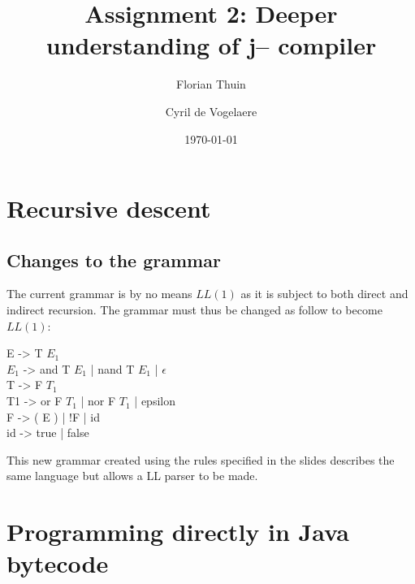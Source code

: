 \documentclass[a4paper, 11pt]{article}
\author{Florian Thuin \and Cyril de Vogelaere}
\date{\today}
\title{Assignment 2: Deeper understanding of j-- compiler}
\begin{document}
    \maketitle
    \tableofcontents

    \section{Recursive descent}
    \subsection{Changes to the grammar}

    	The current grammar is by no means $LL(1)$ as it is subject to both direct and
    	indirect recursion. The grammar must thus be changed as follow to become $LL(1)$:
    	\newline

    	\begin{flushleft}
    	E -> T $E_1$ \\
    	$E_1$ -> and T $E_1$ | nand T $E_1$ | $\epsilon$ \\
    	T -> F $T_1$ \\
		T1 -> or F $T_1$ | nor F $T_1$ | epsilon \\
		F -> ( E ) | !F | id \\
		id -> true | false \\
		\end{flushleft}

    	This new grammar created using the rules specified in the slides describes
    	the same language but allows a LL parser to be made.

    \section{Programming directly in Java bytecode}
\end{document}
